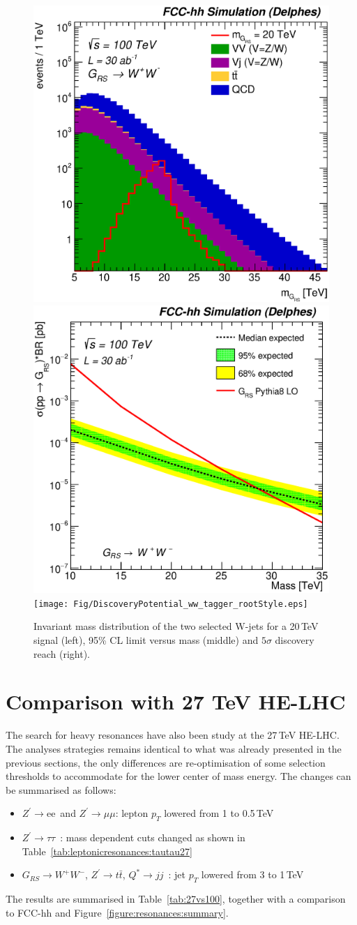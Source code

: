 \documentclass[a4paper,11pt]{article}
\newcommand*{\Zptata}{\ensuremath{Z^{\prime}\rightarrow \tau\tau}}
\newcommand*{\Zpee}{\ensuremath{Z^{\prime}\rightarrow \text{ee}}}
\newcommand*{\Zpmumu}{\ensuremath{Z^{\prime}\rightarrow \mu\mu}}
\newcommand*{\Zptt}{\ensuremath{Z^{\prime} \rightarrow \ttbar}}
\newcommand*{\qjj}{\ensuremath{Q^{*} \rightarrow jj}}
\newcommand*{\rsg}{\ensuremath{G_{RS} \rightarrow W^+W^-}}
\newcommand*{\ttbar}{\ensuremath{t\bar{t}}}
\begin{document}
\begin{figure}[!htb]
  \centering
  \includegraphics[width=0.32\columnwidth]{Fig/Mj1j2_pf08_fit_sel4_nostack_log.eps}
  \includegraphics[width=0.32\columnwidth]{Fig/lim_RSGraviton_ww_fcc_v02.eps}
  \texttt{[image: Fig/DiscoveryPotential\_ww\_tagger\_rootStyle.eps]}
  \caption{Invariant mass distribution of the two selected W-jets for a 20\,TeV signal (left), 95\% CL limit versus mass (middle) and $5\sigma$ discovery reach (right).}
  \label{figure:hadronicresonances:ww}
\end{figure}



\section{Comparison with 27 TeV HE-LHC}
\label{sec:ana27tev}
The search for heavy resonances have also been study at the 27\,TeV HE-LHC. The analyses strategies remains identical to what was already presented in the previous sections, the only differences are re-optimisation of some selection thresholds to accommodate for the lower center of mass energy. The changes can be summarised as follows:
\begin{itemize}
\item \Zpee\ and \Zpmumu : lepton $p_T$ lowered from 1 to 0.5\,TeV
\item \Zptata\ : mass dependent cuts changed as shown in Table~\ref{tab:leptonicresonances:tautau27}
\item \rsg, \Zptt, \qjj\ : jet $p_T$ lowered from 3 to 1\,TeV
\end{itemize}
The results are summarised in Table~\ref{tab:27vs100}, together with a comparison to FCC-hh and Figure~\ref{figure:resonances:summary}.
\end{document}
